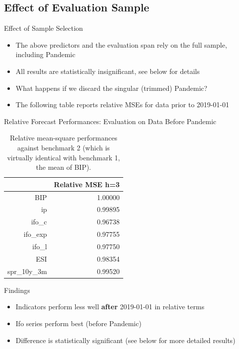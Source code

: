 \documentclass{beamer}
\begin{document}
\subsection{Effect of Evaluation Sample}


\begin{frame} {Effect of Sample Selection}
\begin{itemize}
\item The above predictors and the evaluation span rely on the full sample, including Pandemic
\item All results are statistically insignificant, see below for details
\item What happens if we discard the singular (trimmed) Pandemic?
\item The following table reports relative MSEs for data prior to 2019-01-01 
\end{itemize}

\end{frame}



\begin{frame} {Relative Forecast Performances: Evaluation on Data Before Pandemic}\label{rmse2}

\begin{table}[ht]
\centering
\begin{tabular}{rr}
  \hline
 & Relative MSE h=3 \\ 
  \hline
BIP & 1.00000 \\ 
  ip & 0.99895 \\ 
  ifo\_c & 0.96738 \\ 
  ifo\_exp & 0.97755 \\ 
  ifo\_l & 0.97750 \\ 
  ESI & 0.98354 \\ 
  spr\_10y\_3m & 0.99520 \\ 
   \hline
\end{tabular}
\caption{Relative mean-square performances against benchmark 2 (which is virtually identical with benchmark 1, the mean of BIP).} 
\label{perf_var1}
\end{table}\end{frame}




\begin{frame} {Findings}
\begin{itemize}
\item Indicators perform less well \textbf{after} 2019-01-01 in relative terms
\item Ifo series perform best (before Pandemic)
\item Difference is statistically significant (see below for more detailed results)
\end{itemize}

\end{frame}
\end{document}
